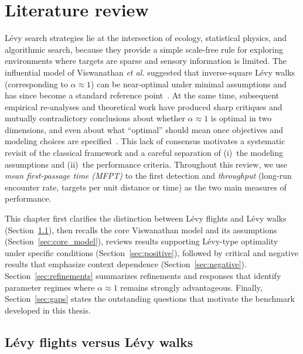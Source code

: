 \chapter{Literature review}
\label{ch:literature_review}

L\'evy search strategies lie at the intersection of ecology, statistical physics, and algorithmic search, because they provide a simple scale-free rule for exploring environments where targets are sparse and sensory information is limited. The influential model of Viswanathan \emph{et al.} suggested that inverse-square L\'evy walks (corresponding to $\alpha \approx 1$) can be near-optimal under minimal assumptions and has since become a standard reference point~\cite{viswanathan1999optimizing}. At the same time, subsequent empirical re-analyses and theoretical work have produced sharp critiques and mutually contradictory conclusions about whether $\alpha \approx 1$ is optimal in two dimensions, and even about what ``optimal'' should mean once objectives and modeling choices are specified~\cite{buldyrev2021comment,edwards2007revisiting,james2011assessing,levernier2020inverse,palyulin2014levy,plank2008optimal}. This lack of consensus motivates a systematic revisit of the classical framework and a careful separation of (i)~the modeling assumptions and (ii)~the performance criteria. Throughout this review, we use \emph{mean first-passage time (MFPT)} to the first detection and \emph{throughput} (long-run encounter rate, targets per unit distance or time) as the two main measures of performance.

This chapter first clarifies the distinction between L\'evy flights and L\'evy walks (Section~\ref{sec:flights_vs_walks}), then recalls the core Viswanathan model and its assumptions (Section~\ref{sec:core_model}), reviews results supporting L\'evy-type optimality under specific conditions (Section~\ref{sec:positive}), followed by critical and negative results that emphasize context dependence (Section~\ref{sec:negative}). Section~\ref{sec:refinements} summarizes refinements and responses that identify parameter regimes where $\alpha \approx 1$ remains strongly advantageous. Finally, Section~\ref{sec:gaps} states the outstanding questions that motivate the benchmark developed in this thesis.

\section{L\'evy flights versus L\'evy walks}
\label{sec:flights_vs_walks}

